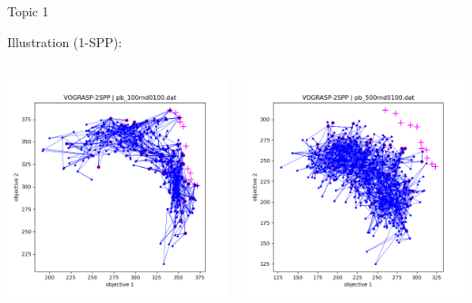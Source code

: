 \documentclass[10pt,xcolor=dvipsnames]{beamer}
\begin{document}
\begin{frame}{Topic 1}
\vspace{2mm}

Illustration (1-SPP): 

\begin{columns}
\begin{column}{0.5\textwidth}
\includegraphics[scale=0.4]{VOGRASP100.png}
\end{column}
\begin{column}{0.5\textwidth}
 \includegraphics[scale=0.4]{VOGRASP500exact.png}
\end{column}
\end{columns}
\vspace{-2mm}


\end{frame}
\end{document}

